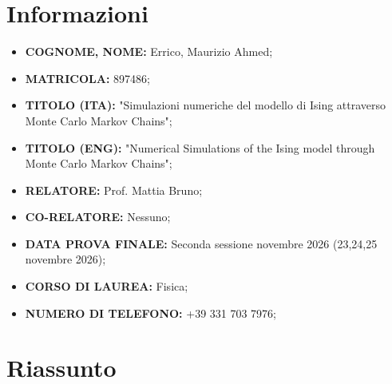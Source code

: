 \documentclass[11pt,a4paper]{article}
\newcommand{\br}{
  \par\vspace{0.4em}
  \noindent\makebox[\linewidth]{\rule{0.5\linewidth}{0.2pt}}
  \par\vspace{0.4em}
}
\begin{document}
\section*{Informazioni}
\vspace{0.4em}

\small
{
	\begin{itemize}[leftmargin=*,itemsep=0.15em]

		
		\item \textbf{COGNOME, NOME:} Errico, Maurizio Ahmed;
		\item \textbf{MATRICOLA:} 897486;
		\item \textbf{TITOLO (ITA):} "Simulazioni numeriche del modello di Ising attraverso Monte Carlo Markov Chains";
		\item \textbf{TITOLO (ENG):} "Numerical Simulations of the Ising model through Monte Carlo Markov Chains";
		\item \textbf{RELATORE:} Prof. Mattia Bruno;
		\item \textbf{CO-RELATORE:} Nessuno;
		\item \textbf{DATA PROVA FINALE:} Seconda sessione novembre 2026 (23,24,25 novembre 2026);
		\item \textbf{CORSO DI LAUREA:} Fisica;
		\item \textbf{NUMERO DI TELEFONO:} +39 331 703 7976;

	\end{itemize}
}
\normalsize

\br

\section*{Riassunto}
\end{document}
